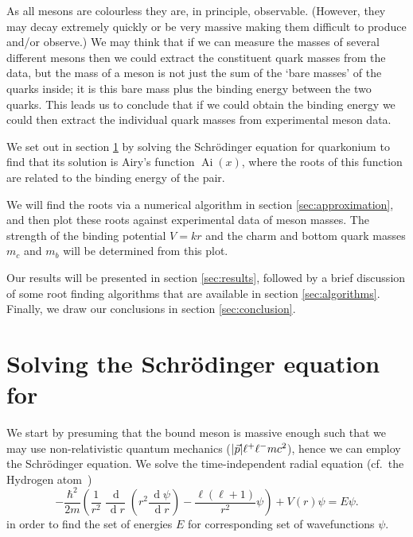 \documentclass[]{article}
\renewcommand{\d}[1]{\ensuremath{\,\operatorname{d}\!{#1}}}
\renewcommand{\mod}[1]{\ensuremath{\lvert {#1} \rvert}}
\newcommand{\Ai}[1]{\ensuremath{\operatorname{Ai}({#1})}}
\begin{document}

As all mesons are colourless they are, in principle, observable. (However, they may decay extremely quickly or be very massive making them difficult to produce and/or observe.) We may think that if we can measure the masses of several different mesons then we could extract the constituent quark masses from the data, but the mass of a meson is not just the sum of the `bare masses' of the quarks inside; it is this bare mass plus the binding energy between the two quarks. This leads us to conclude that if we could obtain the binding energy we could then extract the individual quark masses from experimental meson data.

We set out in section \ref{sec:schrodinger} by solving the Schr\"{o}dinger equation for quarkonium to find that its solution is Airy's function $\Ai{x}$, where the roots of this function are related to the binding energy of the \qqbar pair.

We will find the roots via a numerical algorithm in section \ref{sec:approximation}, and then plot these roots against experimental data of meson masses. The strength of the binding potential $V=kr$ and the charm and bottom quark masses $m_{c}$ and $m_{b}$ will be determined from this plot.

Our results will be presented in section \ref{sec:results}, followed by a brief discussion of some root finding algorithms that are available in section \ref{sec:algorithms}. Finally, we draw our conclusions in section \ref{sec:conclusion}.



\section{Solving the Schr\"{o}dinger equation for \qqbar}\label{sec:schrodinger}

We start by presuming that the bound \qqbar meson is massive enough such that we may use non-relativistic quantum mechanics ($\mod{\vec{p}} \muchless mc^{2}$), hence we can employ the Schr\"{o}dinger equation. We solve the time-independent radial equation (cf.\ the Hydrogen atom~\cite{ref:dgriffithsquantum})
\begin{equation}\label{eqn:schrodinger}
-\frac{\hbar^{2}}{2m}\left (
	\frac{1}{r^{2}} \frac{\d{}}{\d{r}} \left (
		r^{2} \frac{\d{\psi}}{\d{r}}
	\right )
	- \frac{\ell(\ell+1)}{r^{2}}\psi
\right )
+ V(r)\psi = E\psi.
\end{equation}
in order to find the set of energies $E$ for corresponding set of wavefunctions $\psi$.
\end{document}
